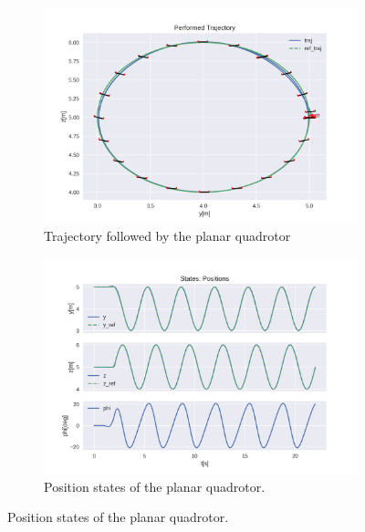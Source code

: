 \documentclass{thesisreport}
\begin{document}
\begin{figure}[H]
	\begin{subfigure}{0.48\textwidth}
		\includegraphics[width=\linewidth]{Images/acados_simulations/circular_trajectory/planar_quadrotor/noiseless/sim.png}
		\caption{Trajectory followed by the planar quadrotor} \label{fig:planar_sim_2d_noiseless}
	\end{subfigure}\hspace*{\fill}
	\begin{subfigure}{0.48\textwidth}
		\includegraphics[width=\linewidth]{Images/acados_simulations/circular_trajectory/planar_quadrotor/noiseless/posStates.png}
		\caption{Position states of the planar quadrotor.} \label{fig:planar_sim_pose_noiseless}
	\end{subfigure}


\end{figure}
\end{document}
